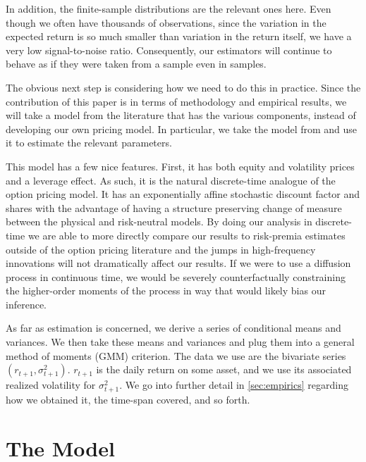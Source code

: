 \documentclass[11pt, letterpaper, twoside]{article}
\begin{document}
In addition, the finite-sample distributions are the relevant ones here. Even though we often have thousands of observations, since the variation in the expected return is so much smaller than variation in the return itself, we have a very low signal-to-noise ratio. Consequently, our estimators will continue to behave as if they were taken from a  sample even in  samples.

The obvious next step is considering how we need to do this in practice. Since the contribution of this paper is in terms of methodology and empirical results, we will take a model from the literature that has the various components, instead of developing our own pricing model. In particular, we take the model from \textcite{han2018leverage} and use it to estimate the relevant parameters. 

This model has a few nice features. First, it has both equity and volatility prices and a leverage effect. As such, it is the natural discrete-time analogue of the \textcite{heston1993closedform} option pricing model. It has an exponentially affine stochastic discount factor and shares with \textcite{heston1993closedform} the advantage of having a structure preserving change of measure between the physical and risk-neutral models. By doing our analysis in discrete-time we are able to more directly compare our results to risk-premia estimates outside of the option pricing literature and the jumps in high-frequency innovations will not dramatically affect our results. If we were to use a diffusion process in continuous time, we would be severely counterfactually constraining the higher-order moments of the process in way that would likely bias our inference. 

As far as estimation is concerned, we derive a series of conditional means and variances. We then take these means and variances and plug them into a general method of moments (GMM) criterion. The data we use are the bivariate series $(r_{t+1}, \sigma^2_{t+1})$. $r_{t+1}$ is the daily return on some asset, and we use its associated realized volatility for $\sigma^2_{t+1}$. We go into further detail in \cref{sec:empirics} regarding how we obtained it, the time-span covered, and so forth.

\section{The Model}\label{sec:model}

\addtocounter{subsection}{1}
\end{document}
